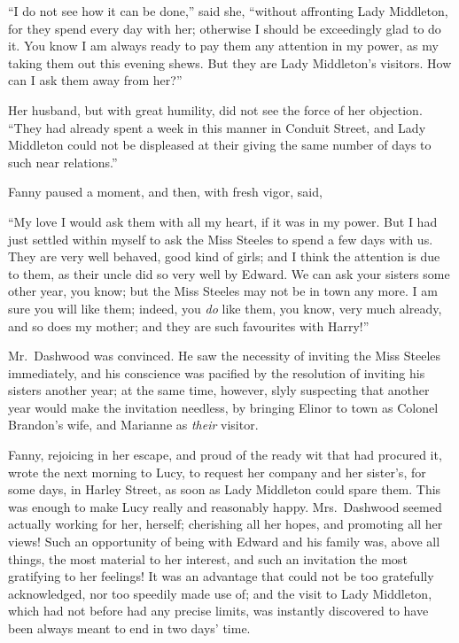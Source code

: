``I do not see how it can be done,'' said she,
``without affronting Lady Middleton, for they spend every day
with her; otherwise I should be exceedingly glad to do it.
You know I am always ready to pay them any attention
in my power, as my taking them out this evening shews.
But they are Lady Middleton's visitors.  How can I ask them
away from her?''

Her husband, but with great humility, did not see
the force of her objection.  ``They had already spent a week
in this manner in Conduit Street, and Lady Middleton
could not be displeased at their giving the same number
of days to such near relations.''

Fanny paused a moment, and then, with fresh vigor, said,

``My love I would ask them with all my heart, if it
was in my power.  But I had just settled within myself
to ask the Miss Steeles to spend a few days with us.
They are very well behaved, good kind of girls; and I think
the attention is due to them, as their uncle did so very
well by Edward.  We can ask your sisters some other year,
you know; but the Miss Steeles may not be in town any more.
I am sure you will like them; indeed, you \emph{do} like them,
you know, very much already, and so does my mother; and they
are such favourites with Harry!''

Mr.\ Dashwood was convinced.  He saw the necessity
of inviting the Miss Steeles immediately, and his conscience
was pacified by the resolution of inviting his sisters
another year; at the same time, however, slyly suspecting
that another year would make the invitation needless,
by bringing Elinor to town as Colonel Brandon's wife,
and Marianne as \emph{their} visitor.

Fanny, rejoicing in her escape, and proud of the ready
wit that had procured it, wrote the next morning to Lucy,
to request her company and her sister's, for some days,
in Harley Street, as soon as Lady Middleton could spare them.
This was enough to make Lucy really and reasonably happy.
Mrs.\ Dashwood seemed actually working for her, herself;
cherishing all her hopes, and promoting all her views!
Such an opportunity of being with Edward and his family was,
above all things, the most material to her interest,
and such an invitation the most gratifying to her
feelings!  It was an advantage that could not be too
gratefully acknowledged, nor too speedily made use of;
and the visit to Lady Middleton, which had not before had
any precise limits, was instantly discovered to have been
always meant to end in two days' time.

